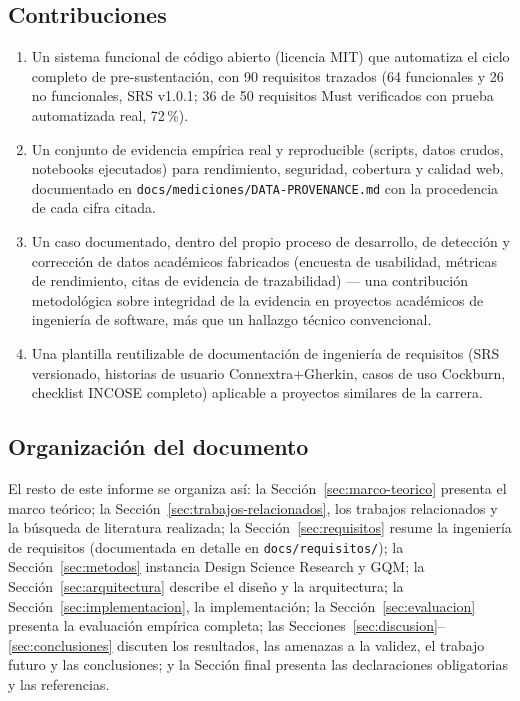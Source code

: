 \subsection{Contribuciones}

\begin{enumerate}[nosep]
    \item Un sistema funcional de código abierto (licencia MIT) que automatiza el ciclo completo de
    pre-sustentación, con 90 requisitos trazados (64 funcionales y 26 no funcionales, SRS v1.0.1; 36 de
    50 requisitos Must verificados con prueba automatizada real, 72\,\%).
    \item Un conjunto de evidencia empírica real y reproducible (scripts, datos crudos, notebooks
    ejecutados) para rendimiento, seguridad, cobertura y calidad web, documentado en
    \texttt{docs/mediciones/DATA-PROVENANCE.md} con la procedencia de cada cifra citada.
    \item Un caso documentado, dentro del propio proceso de desarrollo, de detección y corrección de
    datos académicos fabricados (encuesta de usabilidad, métricas de rendimiento, citas de evidencia de
    trazabilidad) --- una contribución metodológica sobre integridad de la evidencia en proyectos
    académicos de ingeniería de software, más que un hallazgo técnico convencional.
    \item Una plantilla reutilizable de documentación de ingeniería de requisitos (SRS versionado,
    historias de usuario Connextra+Gherkin, casos de uso Cockburn, checklist INCOSE completo) aplicable a
    proyectos similares de la carrera.
\end{enumerate}

\subsection{Organización del documento}

El resto de este informe se organiza así: la Sección~\ref{sec:marco-teorico} presenta el marco teórico;
la Sección~\ref{sec:trabajos-relacionados}, los trabajos relacionados y la búsqueda de literatura
realizada; la Sección~\ref{sec:requisitos} resume la ingeniería de requisitos (documentada en detalle en
\texttt{docs/requisitos/}); la Sección~\ref{sec:metodos} instancia Design Science Research y GQM; la
Sección~\ref{sec:arquitectura} describe el diseño y la arquitectura; la Sección~\ref{sec:implementacion},
la implementación; la Sección~\ref{sec:evaluacion} presenta la evaluación empírica completa; las
Secciones~\ref{sec:discusion}--\ref{sec:conclusiones} discuten los resultados, las amenazas a la validez,
el trabajo futuro y las conclusiones; y la Sección final presenta las declaraciones obligatorias y las
referencias.
\newpage
